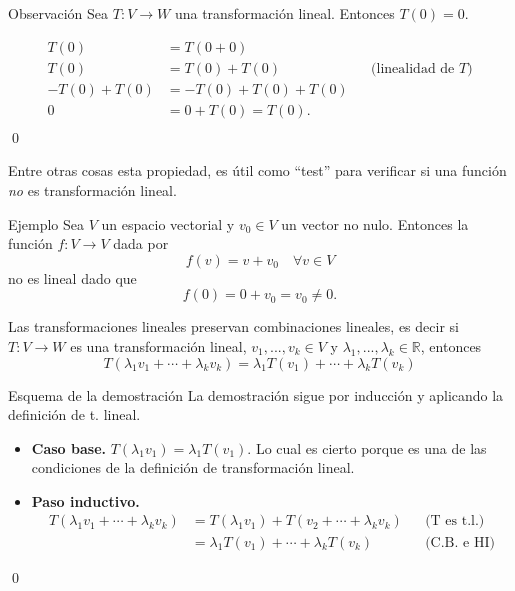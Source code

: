 \documentclass[handout]{beamer} %
\newcommand{\R}{\mathbb R}
\begin{document}
\begin{frame}


\begin{block}{Observación}
Sea $T:V\longrightarrow W$ una transformación lineal. Entonces $T(0)=0$. \pause
\end{block}
\begin{demostracion}
    \vskip -0.8cm
\begin{align*}
T(0)&=T(0+0)&&\\
T(0)&=T(0)+T(0)&&\text{(linealidad de $T$)}\\
-T(0) + T(0)&=- T(0) + T(0)+T(0)&&\\
0&= 0 + T(0) = T(0).&& \\
\end{align*}\qed 
\end{demostracion}

\vskip 2cm

\end{frame}


\begin{frame}

Entre otras cosas esta propiedad, es útil como ``test'' para verificar si una función \textit{no} es transformación lineal. 
\pause
\
\begin{exampleblock}{Ejemplo}
Sea $V$ un espacio vectorial y $v_0\in V$ un vector no nulo. Entonces la función $f:V\longrightarrow V$ dada por 
$$
f(v)=v+v_0\quad\forall v\in V
$$
no es lineal dado que
$$
f(0)=0+v_0=v_0\neq0.
$$
\end{exampleblock}


\end{frame}

\begin{frame}
\begin{observacion}
Las transformaciones lineales preservan combinaciones lineales, es decir si $T:V\longrightarrow W$ es una transformación lineal, $v_1, ..., v_k\in V$ y $\lambda_1, ..., \lambda_k\in\R$, entonces
$$
T(\lambda_1v_1+\cdots+\lambda_kv_k)=\lambda_1T(v_1)+\cdots+\lambda_kT(v_k)
$$
\end{observacion}\pause
\begin{block}{Esquema de la demostración}\pause
    La demostración sigue por inducción y aplicando la definición de t. lineal. 
\begin{itemize}
    \item \textbf{Caso base.}  $T(\lambda_1v_1)=\lambda_1T(v_1)$. Lo cual es cierto porque es una de las condiciones de la definición de transformación lineal.
    \item \textbf{Paso inductivo.} 
    \begin{align*}
        T(\lambda_1v_1+\cdots+\lambda_kv_k) &= T(\lambda_1v_1)+T(v_2+\cdots+\lambda_kv_k)&&\text{(T es t.l.)}\\
        &=  \lambda_1T(v_1)+\cdots+\lambda_kT(v_k)&&\text{(C.B. e HI)}
    \end{align*}
\end{itemize}
\qed
\end{block}

\end{frame}
\end{document}
